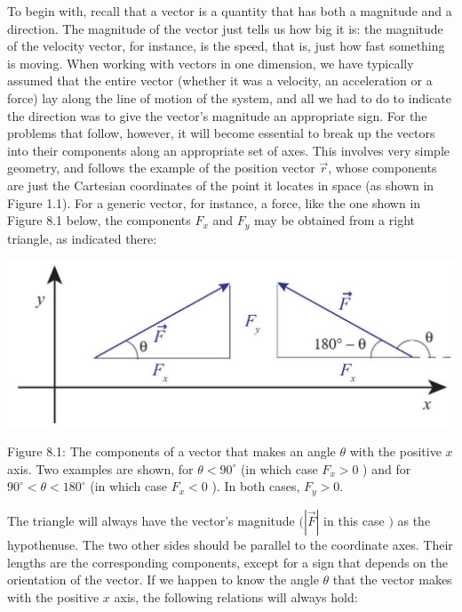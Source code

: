 \documentclass[10pt]{article}
\begin{document}
To begin with, recall that a vector is a quantity that has both a magnitude and a direction. The magnitude of the vector just tells us how big it is: the magnitude of the velocity vector, for instance, is the speed, that is, just how fast something is moving. When working with vectors in one dimension, we have typically assumed that the entire vector (whether it was a velocity, an acceleration or a force) lay along the line of motion of the system, and all we had to do to indicate the direction was to give the vector's magnitude an appropriate sign. For the problems that follow, however, it will become essential to break up the vectors into their components along an appropriate set of axes. This involves very simple geometry, and follows the example of the position vector $\vec{r}$, whose components are just the Cartesian coordinates of the point it locates in space (as shown in Figure 1.1). For a generic vector, for instance, a force, like the one shown in Figure 8.1 below, the components $F_{x}$ and $F_{y}$ may be obtained from a right triangle, as indicated there:

\begin{center}
\includegraphics[max width=\textwidth]{2024_09_14_9969b06773f10b6936e8g-180}
\end{center}

Figure 8.1: The components of a vector that makes an angle $\theta$ with the positive $x$ axis. Two examples are shown, for $\theta<90^{\circ}$ (in which case $F_{x}>0$ ) and for $90^{\circ}<\theta<180^{\circ}$ (in which case $F_{x}<0$ ). In both cases, $F_{y}>0$.

The triangle will always have the vector's magnitude $(|\vec{F}|$ in this case $)$ as the hypothenuse. The two other sides should be parallel to the coordinate axes. Their lengths are the corresponding components, except for a sign that depends on the orientation of the vector. If we happen to know the angle $\theta$ that the vector makes with the positive $x$ axis, the following relations will always hold:
\end{document}
